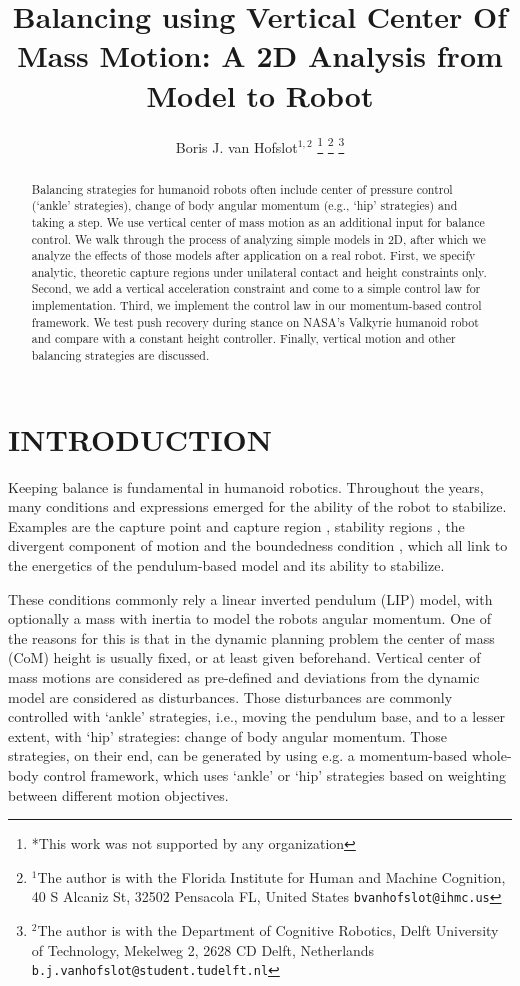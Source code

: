 \documentclass[letterpaper, 10 pt, conference]{ieeeconf}  %
\title{\LARGE \bf
Balancing using Vertical Center Of Mass Motion: A 2D Analysis from Model to Robot
}
\author{Boris J. van Hofslot$^{1,2}$%
\thanks{*This work was not supported by any organization}%
\thanks{$^{1}$The author is with the Florida Institute for Human and Machine Cognition, 40 S Alcaniz St, 32502 Pensacola FL, United States
        {\tt\small bvanhofslot@ihmc.us}}%
\thanks{$^{2}$The author is with the Department of Cognitive Robotics, Delft University of Technology, Mekelweg 2, 2628 CD Delft, Netherlands
        {\tt\small b.j.vanhofslot@student.tudelft.nl}}%
}
\begin{document}
\maketitle
\thispagestyle{empty}
\pagestyle{empty}



\begin{abstract}
Balancing strategies for humanoid robots often include center of pressure control (`ankle' strategies), change of body angular momentum (e.g., `hip' strategies) and taking a step. We use vertical center of mass motion as an additional input for balance control. We walk through the process of analyzing simple models in 2D, after which we analyze the effects of those models after application on a real robot. First, we specify analytic, theoretic capture regions under unilateral contact and height constraints only. Second, we add a vertical acceleration constraint and come to a simple control law for implementation. Third, we implement the control law in our momentum-based control framework. We test push recovery during stance on NASA's Valkyrie humanoid robot and compare with a constant height controller. Finally, vertical motion and other balancing strategies are discussed.
\end{abstract}



\section{INTRODUCTION}
Keeping balance is fundamental in humanoid robotics. Throughout the years, many conditions and expressions emerged for the ability of the robot to stabilize. Examples are the capture point and capture region \cite{pratt2006capture, koolen2012capturability}, stability regions \cite{stephens2007humanoid}, the divergent component of motion \cite{takenaka2009real} and the boundedness condition \cite{lanari2014boundedness}, which all link to the energetics of the pendulum-based model and its ability to stabilize.

These conditions commonly rely a linear inverted pendulum (LIP) model, with optionally a mass with inertia to model the robots angular momentum. One of the reasons for this is that in the dynamic planning problem the center of mass (CoM) height is usually fixed, or at least given beforehand. Vertical center of mass motions are considered as pre-defined and deviations from the dynamic model are considered as disturbances. Those disturbances are commonly controlled with `ankle' strategies, i.e., moving the pendulum base, and to a lesser extent, with `hip' strategies: change of body angular momentum. Those strategies, on their end, can be generated by using e.g. a momentum-based whole-body control framework, which uses `ankle' or `hip' strategies based on weighting between different motion objectives.
\end{document}
